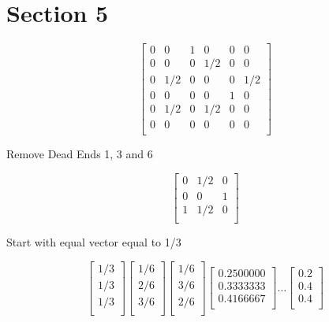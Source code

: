 \documentclass{report}
\begin{document}
\chapter{Section 5}

\[
  \begin{bmatrix}
    0 & 0   & 1 & 0   & 0 & 0   \\
    0 & 0   & 0 & 1/2 & 0 & 0   \\
    0 & 1/2 & 0 & 0   & 0 & 1/2 \\
    0 & 0   & 0 & 0   & 1 & 0   \\
    0 & 1/2 & 0 & 1/2 & 0 & 0   \\
    0 & 0   & 0 & 0   & 0 & 0   \\
  \end{bmatrix}
\]

Remove Dead Ends 1, 3 and 6

\[
  \begin{bmatrix}
    0 & 1/2 & 0 \\
    0 & 0   & 1 \\
    1 & 1/2 & 0 \\
  \end{bmatrix}
\]

Start with equal vector equal to 1/3

\[
  \begin{bmatrix}
    1/3 \\
    1/3 \\
    1/3 \\
  \end{bmatrix}
  \begin{bmatrix}
    1/6 \\
    2/6 \\
    3/6 \\
  \end{bmatrix}
  \begin{bmatrix}
    1/6 \\
    3/6 \\
    2/6 \\
  \end{bmatrix}
  \begin{bmatrix}
    0.2500000 \\
    0.3333333 \\
    0.4166667 \\
  \end{bmatrix}
  \dots
  \begin{bmatrix}
    0.2 \\
    0.4 \\
    0.4 \\
  \end{bmatrix}
\]
\end{document}

